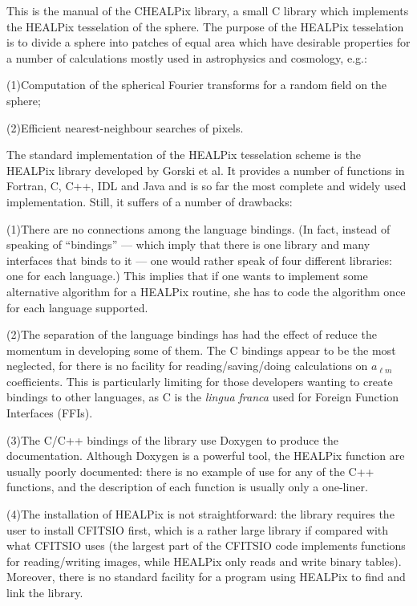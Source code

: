 

This is the manual of the CHEALPix library, a small C library which
implements the HEALPix tesselation of the sphere. The purpose of the
HEALPix tesselation is to divide a sphere into patches of equal area
which have desirable properties for a number of calculations mostly
used in astrophysics and cosmology, e.g.:

\item{(1)}{Computation of the spherical Fourier transforms for a
random field on the sphere;}
\item{(2)}{Efficient nearest-neighbour searches of pixels.}

\fi

The standard implementation of the HEALPix tesselation scheme is the
HEALPix library developed by Gorski et al. It provides a number of
functions in Fortran, C, C++, IDL and Java and is so far the most
complete and widely used implementation. Still, it suffers of a number
of drawbacks:

\item{(1)}{There are no connections among the language bindings. (In
fact, instead of speaking of ``bindings'' --- which imply that there
is one library and many interfaces that binds to it --- one would
rather speak of four different libraries: one for each language.) This
implies that if one wants to implement some alternative algorithm for
a HEALPix routine, she has to code the algorithm once for each
language supported.}

\item{(2)}{The separation of the language bindings has had the effect
of reduce the momentum in developing some of them. The C bindings
appear to be the most neglected, for there is no facility for
reading/saving/doing calculations on $a_{\ell m}$ coefficients. This
is particularly limiting for those developers wanting to create
bindings to other languages, as C is the {\it lingua franca} used for
Foreign Function Interfaces (FFIs).}

\item{(3)}{The C/C++ bindings of the library use Doxygen to produce
the documentation. Although Doxygen is a powerful tool, the HEALPix
function are usually poorly documented: there is no example of use for
any of the C++ functions, and the description of each function is
usually only a one-liner.}

\item{(4)}{The installation of HEALPix is not straightforward: the
library requires the user to install CFITSIO first, which is a rather
large library if compared with what CFITSIO uses (the largest part of
the CFITSIO code implements functions for reading/writing images,
while HEALPix only reads and write binary tables). Moreover, there is
no standard facility for a program using HEALPix to find and link the
library.}

